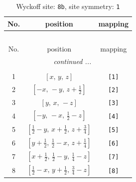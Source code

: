 \documentclass[fleqn,8pt]{jsarticle}
\begin{document}
\begin{longtable}{ccc}
\caption{Wyckoff site: {\tt 8b}, site symmetry: {\tt 1}}
 \\
 \hline \hline
No. & position & mapping \\ \hline \endfirsthead

\multicolumn{2}{l}{\tablename\ \thetable{}} \\
 \hline \hline
No. & position & mapping \\ \hline \endhead

 \hline \hline
\multicolumn{2}{r}{\footnotesize\it continued ...} \\ \endfoot

 \hline \hline
\multicolumn{2}{r}{} \\ \endlastfoot

1 & $\left[ x,\, y,\, z \right]$ & {\tt [1]} \\ \hline
2 & $\left[ - x,\, - y,\, z + \frac{1}{2} \right]$ & {\tt [2]} \\ \hline
3 & $\left[ y,\, x,\, - z \right]$ & {\tt [3]} \\ \hline
4 & $\left[ - y,\, - x,\, \frac{1}{2} - z \right]$ & {\tt [4]} \\ \hline
5 & $\left[ \frac{1}{2} - y,\, x + \frac{1}{2},\, z + \frac{3}{4} \right]$ & {\tt [5]} \\ \hline
6 & $\left[ y + \frac{1}{2},\, \frac{1}{2} - x,\, z + \frac{1}{4} \right]$ & {\tt [6]} \\ \hline
7 & $\left[ x + \frac{1}{2},\, \frac{1}{2} - y,\, \frac{1}{4} - z \right]$ & {\tt [7]} \\ \hline
8 & $\left[ \frac{1}{2} - x,\, y + \frac{1}{2},\, \frac{3}{4} - z \right]$ & {\tt [8]} \\
\end{longtable}
\end{document}
